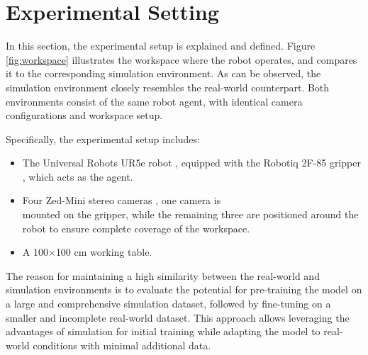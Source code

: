 \section{Experimental Setting}
\label{sec:real_world_exp_setting}
In this section, the experimental setup is explained and defined. Figure \ref{fig:workspace} illustrates the workspace where the robot operates, and compares it to the corresponding simulation environment. As can be observed, the simulation environment closely resembles the real-world counterpart. Both environments consist of the same robot agent, with identical camera configurations and workspace setup.


Specifically, the experimental setup includes:
\begin{itemize}
    \item The Universal Robots UR5e robot \cite{ur5e}, equipped with the Robotiq 2F-85 gripper \cite{robotiq}, which acts as the agent.
    \item Four Zed-Mini stereo cameras \cite{zed}, one camera is \\ mounted on the gripper, while the remaining three are positioned around the robot to ensure complete coverage of the workspace.
    \item A 100$\times$100 cm working table.
\end{itemize}

The reason for maintaining a high similarity between the real-world and simulation environments is to evaluate the potential for pre-training the model on a large and comprehensive simulation dataset, followed by fine-tuning on a smaller and incomplete real-world dataset. This approach allows leveraging the advantages of simulation for initial training while adapting the model to real-world conditions with minimal additional data.
